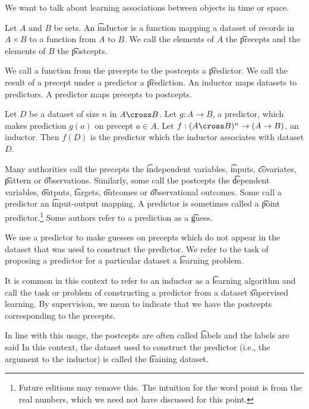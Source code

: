 

We want to talk about learning
associations between objects
in time or space.


Let $A$ and $B$ be sets.
An \t{inductor} is a function mapping a dataset of records in $A \times B$ to a function from $A$ to $B$.
We call the elements of $A$ the \t{precepts} and the elements of $B$ the \t{postcepts}.

We call a function from the precepts to the postcepts a \t{predictor}.
We call the result of a precept under a predictor a \t{prediction}.
An inductor maps datasets to predictors.
A predictor maps precepts to postcepts.


Let $D$ be a dataset of size $n$ in $A \cross B$.
Let $g: A \to B$, a predictor, which makes prediction $g(a)$ on precept $a \in A$.
Let $f: (A \cross B)^n \to (A \to B)$, an inductor.
Then $f(D)$ is the predictor which the inductor associates with dataset $D$.


Many authorities call the precepts the \t{independent variables}, \t{inputs}, \t{covariates}, \t{pattern} or \t{observations}.
Similarly, some call the postcepts the \t{dependent variables}, \t{outputs}, \t{targets}, \t{outcomes} or \t{observational outcomes}.
Some call a predictor an \t{input-output} mapping.
A predictor is sometimes called a \t{point predictor}.\footnote{Future editions may remove this. The intuition for the word point is from the real numbers, which we need not have discussed for this point.}
Some authors refer to a prediction as a \t{guess}.


We use a predictor to make guesses on precepts which do not appear in the dataset that was used to construct the predictor.
We refer to the task of proposing a predictor for a particular dataset a \t{learning problem}.

It is common in this context to refer to an inductor as a \t{learning algorithm} and call the task or problem of constructing a predictor from a dataset  \t{supervised learning}.
By supervision, we mean to indicate that we have the postcepts corresponding to the precepts.

In line with this usage, the postcepts are often called \t{labels} and the labels are said 
In this context, the dataset used to construct the predictor (i.e., the argument to the inductor) is called the \t{training dataset}.
